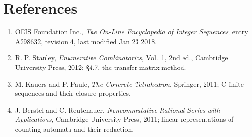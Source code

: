 \documentclass[11pt]{article}
\theoremstyle{definition}
\begin{document}
\section{References}

\begin{enumerate}

\item OEIS Foundation Inc., \emph{The On-Line Encyclopedia of Integer Sequences}, entry \href{https://oeis.org/A298632}{A298632}, revision 4, last modified Jan 23 2018.

\item R. P. Stanley, \emph{Enumerative Combinatorics}, Vol.~1, 2nd ed., Cambridge University Press, 2012; \S4.7, the transfer-matrix method.

\item M. Kauers and P. Paule, \emph{The Concrete Tetrahedron}, Springer, 2011; C-finite sequences and their closure properties.

\item J. Berstel and C. Reutenauer, \emph{Noncommutative Rational Series with Applications}, Cambridge University Press, 2011; linear representations of counting automata and their reduction.

\end{enumerate}
\end{document}
